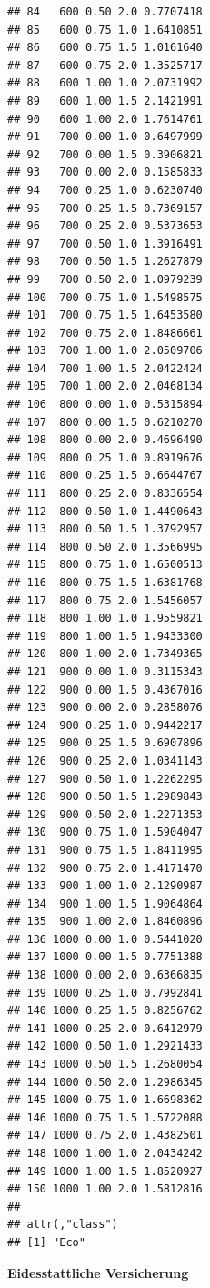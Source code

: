 \documentclass[11pt,a4paper]{article}
\begin{document}
\begin{verbatim}
## 84   600 0.50 2.0 0.7707418
## 85   600 0.75 1.0 1.6410851
## 86   600 0.75 1.5 1.0161640
## 87   600 0.75 2.0 1.3525717
## 88   600 1.00 1.0 2.0731992
## 89   600 1.00 1.5 2.1421991
## 90   600 1.00 2.0 1.7614761
## 91   700 0.00 1.0 0.6497999
## 92   700 0.00 1.5 0.3906821
## 93   700 0.00 2.0 0.1585833
## 94   700 0.25 1.0 0.6230740
## 95   700 0.25 1.5 0.7369157
## 96   700 0.25 2.0 0.5373653
## 97   700 0.50 1.0 1.3916491
## 98   700 0.50 1.5 1.2627879
## 99   700 0.50 2.0 1.0979239
## 100  700 0.75 1.0 1.5498575
## 101  700 0.75 1.5 1.6453580
## 102  700 0.75 2.0 1.8486661
## 103  700 1.00 1.0 2.0509706
## 104  700 1.00 1.5 2.0422424
## 105  700 1.00 2.0 2.0468134
## 106  800 0.00 1.0 0.5315894
## 107  800 0.00 1.5 0.6210270
## 108  800 0.00 2.0 0.4696490
## 109  800 0.25 1.0 0.8919676
## 110  800 0.25 1.5 0.6644767
## 111  800 0.25 2.0 0.8336554
## 112  800 0.50 1.0 1.4490643
## 113  800 0.50 1.5 1.3792957
## 114  800 0.50 2.0 1.3566995
## 115  800 0.75 1.0 1.6500513
## 116  800 0.75 1.5 1.6381768
## 117  800 0.75 2.0 1.5456057
## 118  800 1.00 1.0 1.9559821
## 119  800 1.00 1.5 1.9433300
## 120  800 1.00 2.0 1.7349365
## 121  900 0.00 1.0 0.3115343
## 122  900 0.00 1.5 0.4367016
## 123  900 0.00 2.0 0.2858076
## 124  900 0.25 1.0 0.9442217
## 125  900 0.25 1.5 0.6907896
## 126  900 0.25 2.0 1.0341143
## 127  900 0.50 1.0 1.2262295
## 128  900 0.50 1.5 1.2989843
## 129  900 0.50 2.0 1.2271353
## 130  900 0.75 1.0 1.5904047
## 131  900 0.75 1.5 1.8411995
## 132  900 0.75 2.0 1.4171470
## 133  900 1.00 1.0 2.1290987
## 134  900 1.00 1.5 1.9064864
## 135  900 1.00 2.0 1.8460896
## 136 1000 0.00 1.0 0.5441020
## 137 1000 0.00 1.5 0.7751388
## 138 1000 0.00 2.0 0.6366835
## 139 1000 0.25 1.0 0.7992841
## 140 1000 0.25 1.5 0.8256762
## 141 1000 0.25 2.0 0.6412979
## 142 1000 0.50 1.0 1.2921433
## 143 1000 0.50 1.5 1.2680054
## 144 1000 0.50 2.0 1.2986345
## 145 1000 0.75 1.0 1.6698362
## 146 1000 0.75 1.5 1.5722088
## 147 1000 0.75 2.0 1.4382501
## 148 1000 1.00 1.0 2.0434242
## 149 1000 1.00 1.5 1.8520927
## 150 1000 1.00 2.0 1.5812816
## 
## attr(,"class")
## [1] "Eco"
\end{verbatim}

\pagebreak
\renewcommand*{\mkbibnamefamily}[1]{\textbf{#1}}
\renewcommand*{\mkbibnamegiven}[1]{\textbf{#1}}
\renewcommand*{\mkbibnameprefix}[1]{\textbf{#1}}
\renewcommand*{\mkbibnamesuffix}[1]{\textbf{#1}}
\printbibliography[title=References]

\newpage
\textbf{Eidesstattliche Versicherung}

\bigskip
\end{document}
